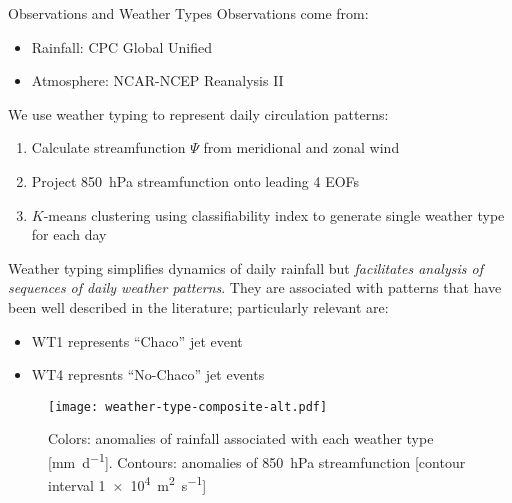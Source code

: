 \begin{block}{Observations and Weather Types}
  Observations come from:
  \begin{itemize}
    \item Rainfall: CPC Global Unified \cite{xie2010cpc}
    \item Atmosphere: NCAR-NCEP Reanalysis II \cite{Kanamitsu:2002kk}
  \end{itemize}
  We use weather typing \cite{Munoz2015} to represent daily circulation patterns:
  \begin{enumerate}
    \item Calculate streamfunction $\Psi$ from meridional and zonal wind \cite{Dawson:2016ge}
    \item Project \SI{850}{\hecto\pascal} streamfunction onto leading 4 EOFs
    \item $K$-means clustering using classifiability index \cite{Michelangeli1995} to generate single weather type for each day
  \end{enumerate}
  Weather typing simplifies dynamics of daily rainfall but \emph{facilitates analysis of sequences of daily weather patterns}.
  They are associated with patterns that have been well described in the literature; particularly relevant are:
  \begin{itemize}
    \item WT1 represents ``Chaco'' jet event \cite{Salio:2002ev}
    \item WT4 represnts ``No-Chaco'' jet events \cite{Vera:2006ib}
  \end{itemize}
  \begin{mdframed}
  \begin{figure}
  	\noindent\texttt{[image: weather-type-composite-alt.pdf]}
  	\caption{
  		Colors: anomalies of rainfall associated with each weather type [\si{\milli\meter\per\day}].
      Contours: anomalies of \SI{850}{\hecto\pascal} streamfunction [contour interval \SI{1e4}{\meter\squared\per\second}]
  	}
    \label{fig:weather-types}
  \end{figure}
  \end{mdframed}
\end{block}
